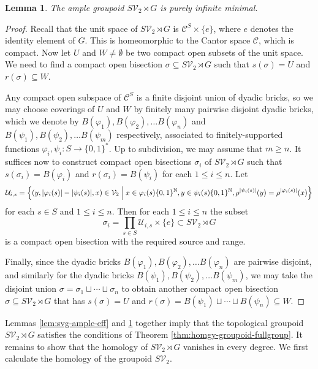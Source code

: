 \documentclass[10pt,a4paper]{amsart}
\numberwithin{equation}{section}
\numberwithin{figure}{section}
\newtheorem{lem}[thm]{Lemma}
\theoremstyle{definition}
\newcommand{\cC}{\mathcal{C}}
\newcommand{\cU}{\mathcal{U}}
\newcommand{\cV}{\mathcal{V}}
\newcommand{\bN}{\mathbb{N}}
\renewcommand{\geq}{\geqslant}
\renewcommand{\leq}{\leqslant}
\begin{document}
\begin{lem}
\label{lem:svg-purely-inf-min}
The ample groupoid $S\mathcal{V}_2 \rtimes {G}$ is purely infinite minimal.
\end{lem}
\begin{proof}
Recall that the unit space of $S\mathcal{V}_2 \rtimes {G}$ is $\cC^S \times \{e\}$, where $e$ denotes the identity element of $G$. This is homeomorphic to the Cantor space $\cC$, which is compact. Now let $U$ and $W \neq \emptyset$ be two compact open subsets of the unit space. We need to find a compact open bisection $\sigma \subseteq S\cV_2 \rtimes G$ such that $s(\sigma) = U$ and $r(\sigma) \subseteq W$.

Any compact open subspace of $\cC^S$ is a finite disjoint union of dyadic bricks, so we may choose coverings of $U$ and $W$ by finitely many pairwise disjoint dyadic bricks, which we denote by $B(\varphi_1),B(\varphi_2),\ldots B(\varphi_n)$ and $B(\psi_1),B(\psi_2),\ldots B(\psi_m)$ respectively, associated to finitely-supported functions $\varphi_i,\psi_i \colon S \to \{0,1\}^\ast$. Up to subdivision, we may assume that $m\geq n$. It suffices now to construct compact open bisections $\sigma_i$ of $S\cV_2 \rtimes G$ such that $s(\sigma_i) = B(\varphi_i)$ and $r(\sigma_i) = B(\psi_i)$ for each $1\leq i\leq n$. Let
\[
\cU_{i,s} = \left\lbrace (y, \lvert \varphi_i(s) \rvert - \lvert \psi_i(s) \rvert ,x) \in \cV_2 \Bigm| x \in \varphi_i(s)\{0,1\}^{\bN}, y\in \psi_i(s)\{0,1\}^{\bN}, \rho^{\lvert \psi_i(s) \rvert}(y) = \rho^{\lvert \varphi_i(s) \rvert}(x) \right\rbrace
\]
for each $s \in S$ and $1\leq i\leq n$. Then for each $1\leq i\leq n$ the subset
\[
\sigma_i = \prod_{s \in S} \cU_{i,s} \times \{e\} \subset S\cV_2 \rtimes G
\]
is a compact open bisection with the required source and range.

Finally, since the dyadic bricks $B(\varphi_1),B(\varphi_2),\ldots B(\varphi_n)$ are pairwise disjoint, and similarly for the dyadic bricks $B(\psi_1),B(\psi_2),\ldots B(\psi_m)$, we may take the disjoint union $\sigma = \sigma_1 \sqcup \cdots \sqcup \sigma_n$ to obtain another compact open bisection $\sigma \subseteq S\cV_2 \rtimes G$ that has $s(\sigma) = U$ and $r(\sigma) = B(\psi_1) \sqcup \cdots \sqcup B(\psi_n) \subseteq W$.
\end{proof}

Lemmas \ref{lem:svg-ample-eff} and \ref{lem:svg-purely-inf-min} together imply that the topological groupoid $S\mathcal{V}_2 \rtimes {G}$ satisfies the conditions of Theorem \ref{thm:homgy-groupoid-fullgroup}. It remains to show that the homology of $S\mathcal{V}_2 \rtimes {G}$ vanishes in every degree. We first calculate the homology of the groupoid $S\mathcal{V}_2$.
\end{document}
